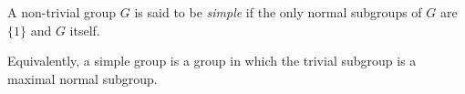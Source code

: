\documentclass[12pt]{article}
\begin{document}
A non-trivial group $G$ is said to be \emph{simple}
if the only normal subgroups of $G$ are $\{1\}$ and $G$ itself.

Equivalently, a simple group is a group in which the trivial subgroup is a maximal normal subgroup.
\end{document}
